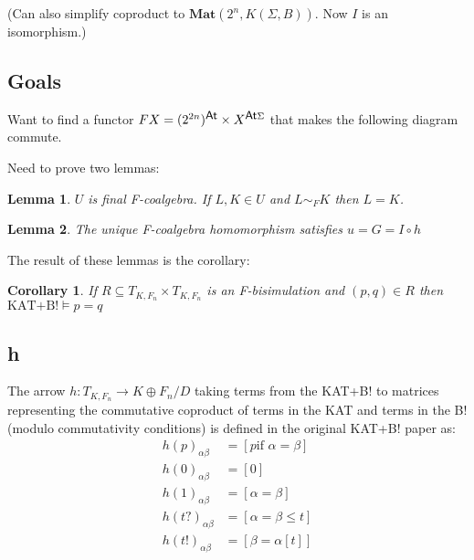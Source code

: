 \documentclass{article}
\newcommand{\atoms}{\textsf{\small{At}}}
\newcommand{\actions}{\Sigma}
\newcommand{\bisim}[1]{\sim_{#1}}
\newcommand{\mat}[1]{\textbf{Mat}(#1)}
\newcommand{\terms}{T_{K,F_n}}
\newcommand{\coproduct}{K \oplus F_n / D}
\newtheorem{corollary}{Corollary}
\newtheorem{lemma}{Lemma}
\begin{document}
  (Can also simplify coproduct to $\mat{2^n, K(\Sigma,B)}$. Now $I$ is an isomorphism.)

\subsection*{Goals}

Want to find a functor $F X = (2^{2n})^\atoms \times X^{\atoms\actions}$ that makes the following diagram commute.
\begin{center}
\end{center}

Need to prove two lemmas:

\begin{lemma}
  $U$ is final F-coalgebra.
  If $L,K \in U$ and $L \bisim{F} K$ then $L = K$.
\end{lemma}

\begin{lemma}
  The unique F-coalgebra homomorphism satisfies $u = G = I \circ h$
\end{lemma}

The result of these lemmas is the corollary:
\begin{corollary}
  If $R \subseteq \terms \times \terms$ is an F-bisimulation and $(p,q) \in R$ then $\mbox{KAT+B!}\vDash p = q$
\end{corollary}


\subsection*{h}
The arrow $h : \terms \rightarrow \coproduct$ taking terms from the KAT+B! to matrices representing the commutative coproduct of terms in the KAT and terms in the B! (modulo commutativity conditions) is defined in the original KAT+B! paper as:
\begin{align*}
  h(p)_{\alpha\beta} &= [p \mbox{if $\alpha=\beta$}]
\\h(0)_{\alpha\beta} &= [0]
\\h(1)_{\alpha\beta} &= [\alpha = \beta]
\\h(t?)_{\alpha\beta} &= [\alpha = \beta \le t]
\\h(t!)_{\alpha\beta} &= [\beta = \alpha[t]]
\end{align*}
\end{document}
